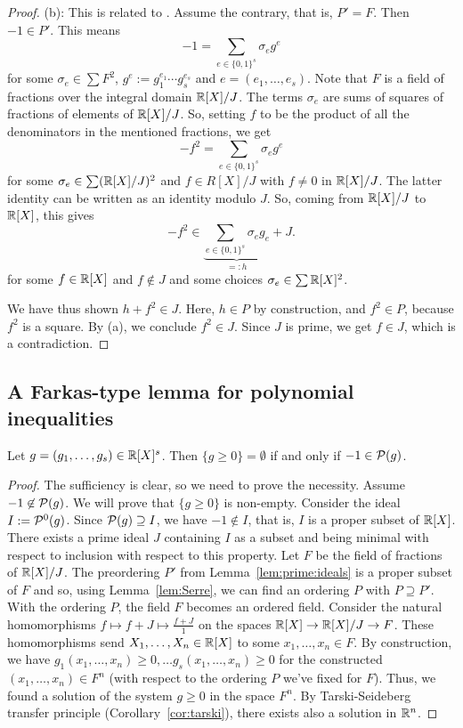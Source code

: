 \begin{proof}
(b): This is related to \cite[Prop.~2.1.6]{Marshall:2008}. Assume the contrary, that is, $P'= F$. Then $-1 \in P'$. This means
\[
	-1 = \sum_{e \in \{0,1\}^s} \sigma_e g^e 
\]
for some $\sigma_e \in \sum F^2$, $g^e := g_1^{e_1} \cdots g_s^{e_s}$ and $e=(e_1,\ldots,e_s)$. Note that $F$ is a field of fractions over the integral domain $\mathbb{R}[X]/J$. The terms $\sigma_e$ are sums of squares of fractions of elements of $\mathbb{R}[X]/J$. So, setting $f$ to be the product of all the denominators in the mentioned fractions, we get
\[
	-f^2 = \sum_{e \in \{0,1\}^s} \sigma_e g^e
\]
for some $\sigma_e \in \sum (\mathbb{R}[X]/J)^2$ and $f \in R[X]/J$ with $f \ne 0$ in $\mathbb{R}[X]/J$. The latter identity can be written as an identity modulo $J$. So, coming from $\mathbb{R}[X] / J$ to $\mathbb{R}[X]$, this gives
\[
	-f^2 \in \underbrace{\sum_{e \in \{0,1\}^s} \sigma_e g_e}_{=:h} + J. 
\]
for some $f \in \mathbb{R}[X]$ and $f \not\in J$ and some choices $\sigma_e \in \sum \mathbb{R}[X]^2$. 

We have thus shown $h + f^2 \in J$. Here, $h \in P$ by construction, and $f^2 \in P$, because $f^2$ is a square. By (a), we conclude $f^2 \in J$. Since $J$ is prime, we get $f \in J$, which is a contradiction. 
\end{proof}


\subsection{A Farkas-type lemma for polynomial inequalities}

\begin{theorem} 
	\label{thm:farkas:pop}
	Let $g = (g_1,\ldots,g_s) \in \mathbb{R}[X]^s$. Then $\{g \ge 0\} = \emptyset$ if and only if $-1 \in \mathcal{P}(g)$. 
\end{theorem}
\begin{proof}
	The sufficiency is clear, so we need to prove the necessity. Assume $-1 \not\in \mathcal{P}(g)$. We will prove that $\{g \ge 0\}$ is non-empty. Consider the ideal $I := \mathcal{P}^0(g)$. Since $\mathcal{P}(g) \supseteq I$, we have $-1 \not\in I$, that is, $I$ is a proper subset of $\mathbb{R}[X]$. There exists a prime ideal $J$ containing $I$ as a subset and being minimal with respect to inclusion with respect to this property. Let $F$ be the field of fractions of $\mathbb{R}[X]/J$. The preordering $P'$ from Lemma~\ref{lem:prime:ideals} is a proper subset of $F$ and so, using Lemma~\ref{lem:Serre}, we can find an ordering $P$ with $P \supseteq P'$. With the ordering $P$, the field $F$ becomes an ordered field. Consider the natural homomorphisms $f \mapsto f+J \mapsto \frac{f+J}{1}$ on the spaces $\mathbb{R}[X] \to \mathbb{R}[X] / J \to F$. These homomorphisms send $X_1,\ldots,X_n \in \mathbb{R}[X]$ to some $x_1,\ldots,x_n \in F$. By construction, we have $g_1(x_1,\ldots,x_n) \ge 0,\ldots g_s(x_1,\ldots,x_n) \ge 0$ for the constructed $(x_1,\ldots,x_n) \in F^n$ (with respect to the ordering $P$ we've fixed for $F$). Thus, we found a solution of the system $g \ge 0$ in the space $F^n$. By Tarski-Seideberg transfer principle (Corollary~\ref{cor:tarski}), there exists also a solution in $\mathbb{R}^n$. 
\end{proof}

